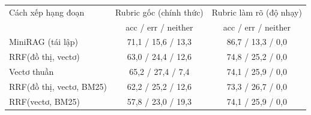 \begin{tabular}{lcc}
\toprule
Cách xếp hạng đoạn & Rubric gốc (chính thức) & Rubric làm rõ (độ nhạy) \\
 & acc / err / neither & acc / err / neither \\
\midrule
MiniRAG (tái lập) & 71{,}1 / 15{,}6 / 13{,}3 & 86{,}7 / 13{,}3 / 0{,}0 \\
RRF(đồ thị, vectơ) & 63{,}0 / 24{,}4 / 12{,}6 & 74{,}8 / 25{,}2 / 0{,}0 \\
Vectơ thuần & 65{,}2 / 27{,}4 / 7{,}4 & 74{,}1 / 25{,}9 / 0{,}0 \\
RRF(đồ thị, vectơ, BM25) & 62{,}2 / 25{,}2 / 12{,}6 & 73{,}3 / 26{,}7 / 0{,}0 \\
RRF(vectơ, BM25) & 57{,}8 / 23{,}0 / 19{,}3 & 74{,}1 / 25{,}9 / 0{,}0 \\
\bottomrule
\end{tabular}
